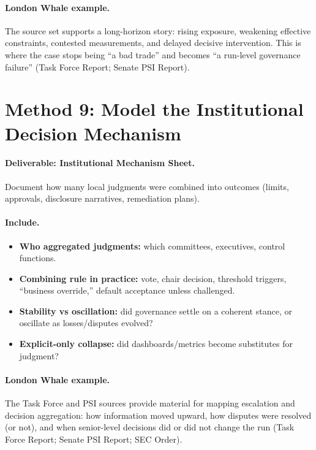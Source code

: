 \paragraph{London Whale example.}
The source set supports a long-horizon story: rising exposure, weakening effective constraints, contested measurements,
and delayed decisive intervention. This is where the case stops being “a bad trade” and becomes “a run-level governance failure”
(Task Force Report; Senate PSI Report).

\section{Method 9: Model the Institutional Decision Mechanism}
\label{sec:m9-institution}

\paragraph{Deliverable: Institutional Mechanism Sheet.}
Document how many local judgments were combined into outcomes (limits, approvals, disclosure narratives, remediation plans).

\paragraph{Include.}
\begin{itemize}
  \item \textbf{Who aggregated judgments:} which committees, executives, control functions.
  \item \textbf{Combining rule in practice:} vote, chair decision, threshold triggers, “business override,” default acceptance unless challenged.
  \item \textbf{Stability vs oscillation:} did governance settle on a coherent stance, or oscillate as losses/disputes evolved?
  \item \textbf{Explicit-only collapse:} did dashboards/metrics become substitutes for judgment?
\end{itemize}

\paragraph{London Whale example.}
The Task Force and PSI sources provide material for mapping escalation and decision aggregation:
how information moved upward, how disputes were resolved (or not), and when senior-level decisions did or did not change the run (Task Force Report; Senate PSI Report; SEC Order).

